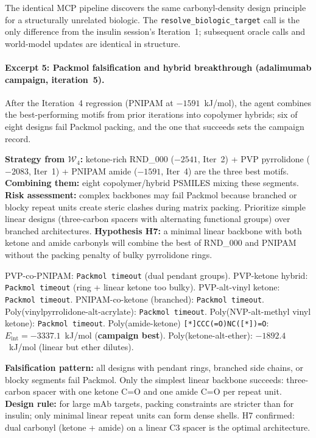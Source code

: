 \documentclass[twocolumn]{fairmeta}
\begin{document}
\noindent The identical MCP pipeline discovers the same carbonyl-density design principle for a structurally unrelated biologic.
The \texttt{resolve\_biologic\_target} call is the only difference from the insulin session's Iteration~1; subsequent oracle calls and world-model updates are identical in structure.

\paragraph{Excerpt 5: Packmol falsification and hybrid breakthrough (adalimumab campaign, iteration~5).}
After the Iteration~4 regression (PNIPAM at $-1591$~kJ/mol), the agent combines the best-performing motifs from prior iterations into copolymer hybrids; six of eight designs fail Packmol packing, and the one that succeeds sets the campaign record.

\begin{agentthought}
\scriptsize
\textbf{Strategy from $\mathcal{W}_4$:} ketone-rich RND\_000 ($-2541$, Iter~2) + PVP pyrrolidone ($-2083$, Iter~1) + PNIPAM amide ($-1591$, Iter~4) are the three best motifs.
\textbf{Combining them:} eight copolymer/hybrid PSMILES mixing these segments.
\textbf{Risk assessment:} complex backbones may fail Packmol because branched or blocky repeat units create steric clashes during matrix packing.
Prioritize simple linear designs (three-carbon spacers with alternating functional groups) over branched architectures.
\textbf{Hypothesis H7:} a minimal linear backbone with both ketone and amide carbonyls will combine the best of RND\_000 and PNIPAM without the packing penalty of bulky pyrrolidone rings.
\end{agentthought}

\begin{toolcall}
\scriptsize
PVP-co-PNIPAM: \texttt{Packmol timeout} (dual pendant groups).
PVP-ketone hybrid: \texttt{Packmol timeout} (ring + linear ketone too bulky).
PVP-alt-vinyl ketone: \texttt{Packmol timeout}.
PNIPAM-co-ketone (branched): \texttt{Packmol timeout}.
Poly(vinylpyrrolidone-alt-acrylate): \texttt{Packmol timeout}.
Poly(NVP-alt-methyl vinyl ketone): \texttt{Packmol timeout}.
Poly(amide-ketone) \texttt{[*]CCC(=O)NC([*])=O}: $E_\text{int} = -3337.1$~kJ/mol (\textbf{campaign best}).
Poly(ketone-alt-ether): $-1892.4$~kJ/mol (linear but ether dilutes).
\end{toolcall}

\begin{agentthought}
\scriptsize
\textbf{Falsification pattern:} all designs with pendant rings, branched side chains, or blocky segments fail Packmol.
Only the simplest linear backbone succeeds: three-carbon spacer with one ketone C=O and one amide C=O per repeat unit.
\textbf{Design rule:} for large mAb targets, packing constraints are stricter than for insulin; only minimal linear repeat units can form dense shells.
H7 confirmed: dual carbonyl (ketone + amide) on a linear C3 spacer is the optimal architecture.
\end{agentthought}
\end{document}
